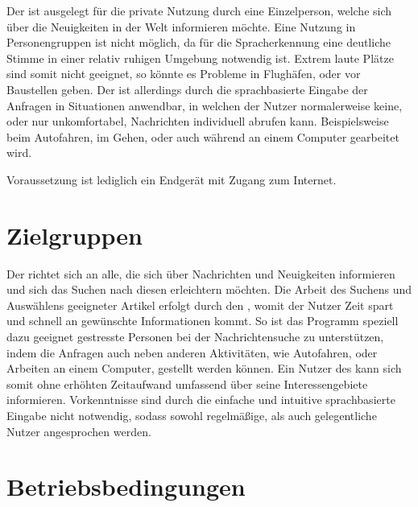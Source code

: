 Der \NewsGenie ist ausgelegt für die private Nutzung durch eine Einzelperson, welche sich über die Neuigkeiten in der Welt informieren möchte. Eine Nutzung in Personengruppen ist nicht möglich, da für die Spracherkennung eine deutliche Stimme in einer relativ ruhigen Umgebung notwendig ist. Extrem laute Plätze sind somit nicht geeignet, so könnte es Probleme in Flughäfen, oder vor Baustellen geben.
Der \NewsGenie ist allerdings durch die sprachbasierte Eingabe der Anfragen in Situationen anwendbar, in welchen der Nutzer normalerweise keine, oder nur unkomfortabel, Nachrichten individuell abrufen kann. Beispielsweise beim Autofahren, im Gehen, oder auch während an einem Computer gearbeitet wird.

Voraussetzung ist lediglich ein Endgerät mit Zugang zum Internet.


\section{Zielgruppen}

Der \NewsGenie richtet sich an alle, die sich über Nachrichten und Neuigkeiten informieren und sich das Suchen nach diesen erleichtern möchten. Die Arbeit des Suchens und Auswählens geeigneter Artikel erfolgt durch den \NewsGenie, womit der Nutzer Zeit spart und schnell an gewünschte Informationen kommt. So ist das Programm speziell dazu geeignet gestresste Personen bei der Nachrichtensuche zu unterstützen, indem die Anfragen auch neben anderen Aktivitäten, wie Autofahren, oder Arbeiten an einem Computer, gestellt werden können. Ein Nutzer des \NewsGenies kann sich somit ohne erhöhten Zeitaufwand umfassend über seine Interessengebiete informieren.
Vorkenntnisse sind durch die einfache und intuitive sprachbasierte Eingabe nicht notwendig, sodass sowohl regelmäßige, als auch gelegentliche Nutzer angesprochen werden.

\section{Betriebsbedingungen}

